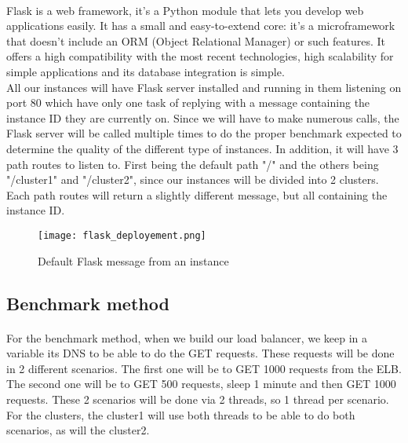 \documentclass[12pt]{article}
\begin{document}
		\paragraph{} Flask is a web framework, it’s a Python module that lets you develop web applications easily. It has a small 
		and easy-to-extend core: it’s a microframework that doesn’t include an ORM (Object Relational Manager) or such features. It 
		offers a high compatibility with the most recent technologies, high scalability for simple applications and its database 
		integration is simple. \\

		\noindent All our instances will have Flask server installed and running in them listening on port 80 which have only one task of replying
		with a message containing the instance ID they are currently on. Since we will have to make numerous calls, the Flask server 
		will be called multiple times to do the proper benchmark expected to determine the quality of the different type of instances. In addition, it will have 3 path routes to listen to. First being the default path "/" and the others being "/cluster1" and "/cluster2", since our instances will be divided into 2 clusters. Each path routes will return a slightly different message, but all containing the instance ID.
		\begin{figure}[htpb]
        \centering
        \texttt{[image: flask\_deployement.png]}
            \caption{Default Flask message from an instance}
            \label{fig:cw}
        \end{figure}
		\bigskip

	\subsection{Benchmark method}
		\paragraph{} For the benchmark method, when we build our load balancer, we keep in a variable its DNS to be able to do the GET requests.
		These requests will be done in 2 different scenarios. The first one will be to GET 1000 requests from the ELB. The second one will be to 
		GET 500 requests, sleep 1 minute and then GET 1000 requests. These 2 scenarios will be done via 2 threads, so 1 thread per scenario. For 
		the clusters, the cluster1 will use both threads to be able to do both scenarios, as will the cluster2.
		\bigskip
		\pagebreak
\end{document}
